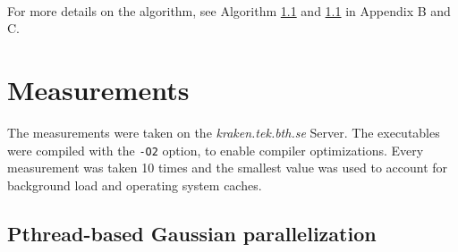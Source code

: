 \documentclass[]{article}
\begin{document}
\paragraph{} For more details on the algorithm, see Algorithm \ref{} and \ref{} in Appendix B and C.

\section{Measurements}

The measurements were taken on the \emph{kraken.tek.bth.se} Server. The executables were compiled with the \texttt{-O2} option, to enable compiler optimizations. Every measurement was taken 10 times and the smallest value was used to account for background load and operating system caches.

\subsection{Pthread-based Gaussian parallelization}



\FloatBarrier
\clearpage
\newpage

\begin{appendices}
\end{appendices}
\end{document}
